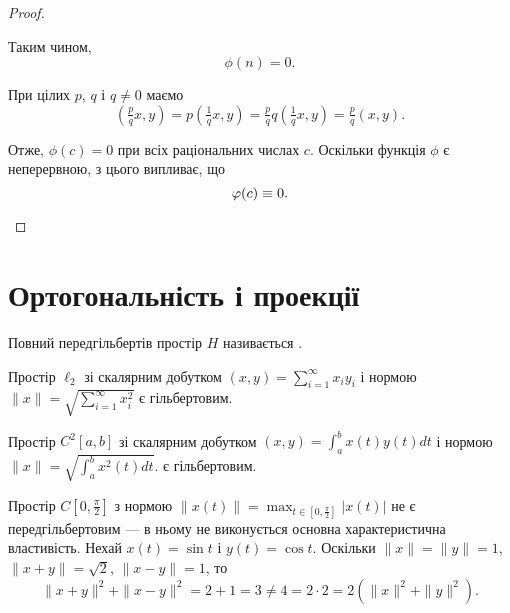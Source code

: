 \begin{proof}
\begin{enumerate}
Таким чином,
\begin{equation*}
    \phi(n) = 0.
\end{equation*}

При цілих $p$, $q$ і $q \ne 0$ маємо
\begin{equation*}
    \left( \tfrac{p}{q} x, y \right) =
    p \left( \tfrac{1}{q} x, y \right) =
    \tfrac{p}{q} q \left( \tfrac{1}{q} x, y \right) =
    \tfrac{p}{q} (x, y).
\end{equation*}

Отже, $\phi(c) = 0$ при всіх раціональних числах $c$. Оскільки
функція $\phi$ є неперервною, з цього випливає, що
\begin{equation*}
    \phi(c) \equiv 0. \qedhere
\end{equation*}
\end{enumerate}
\end{proof}

\section{Ортогональність і проекції}

\begin{definition}
Повний передгільбертів простір $H$ називається .
\end{definition}

\begin{example}
Простір $\ell_2$
зі скалярним добутком $(x, y) = \sum_{i = 1}^\infty x_i y_i$
і нормою $\|x\| = \sqrt{\sum_{i = 1}^\infty x_i^2}$
є гільбертовим.
\end{example}

\begin{example}
Простір $C^2[a, b]$
зі скалярним добутком $(x, y) = \int_a^b x(t) y(t) dt$
і нормою $\|x\| = \sqrt{\int_a^b x^2(t) dt}$.
є гільбертовим.
\end{example}

\begin{example}
Простір $C[0, \frac{\pi}{2}]$
з нормою $\|x(t)\| = \max_{t \in [0, \frac{\pi}{2}]} |x(t)|$
не є передгільбертовим --- в ньому не
виконується основна характеристична властивість. Нехай
$x(t) = \sin t$ і $y(t) = \cos t$. Оскільки $\|x\| = \|y\| = 1$,
$\|x + y\| = \sqrt{2}$, $\|x - y\| = 1$, то
\begin{equation*}
    \|x + y\|^2 + \|x - y\|^2 = 2 + 1 = 3 \ne
    4 = 2 \cdot 2 = 2 (\|x\|^2 + \|y\|^2).
\end{equation*}
\end{example}

